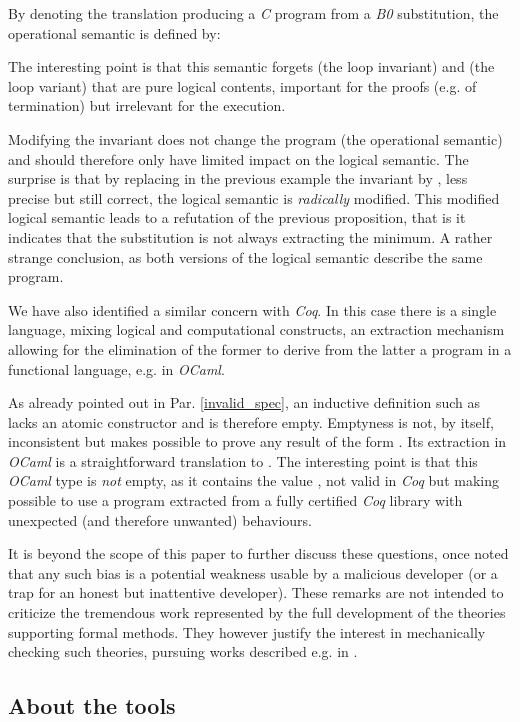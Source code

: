 \documentclass[conference]{IEEEtran}
\begin{document}
By denoting {\small} the translation producing a \emph{C} program from a
\emph{B0} substitution, the operational semantic is defined by:

The interesting point is that this semantic forgets {\small} (the loop invariant) and
{\small} (the loop variant) that are pure logical contents, important for the proofs (e.g.
of termination) but irrelevant for the execution.

Modifying the invariant does not change the program (the operational semantic) and should
therefore only have limited impact on the logical semantic. The surprise is that by replacing
in the previous example the invariant {\small} by
{\small}, less precise but still correct, the logical semantic is
\emph{radically} modified. This modified logical semantic leads to a refutation of the
previous proposition, that is it indicates that the substitution is not always extracting the
minimum. A rather strange conclusion, as both versions of the logical semantic describe the
same program.

We have also identified a similar concern with \emph{Coq}. In this case there is a single
language, mixing logical and computational constructs, an extraction mechanism allowing for
the elimination of the former to derive from the latter a program in a functional language,
e.g. in \emph{OCaml}.

As already pointed out in Par. \ref{invalid_spec}, an inductive definition such as
{\small} lacks an atomic
constructor and is therefore empty. Emptyness is not, by itself, inconsistent but makes
possible to prove any result of the form {\small}. Its extraction in
\emph{OCaml} is a straightforward translation to
{\small}. The interesting point is that this
\emph{OCaml} type is \emph{not} empty, as it contains the value
{\small}, not valid in \emph{Coq} but making
possible to use a program extracted from a fully certified \emph{Coq} library with unexpected
(and therefore unwanted) behaviours.

It is beyond the scope of this paper to further discuss these questions, once noted that any
such bias is a potential weakness usable by a malicious developer (or a trap for an honest
but inattentive developer). These remarks are not intended to criticize the tremendous work
represented by the full development of the theories supporting formal methods. They however
justify the interest in mechanically checking such theories, pursuing works described e.g. in
\cite{cha:1,bod:1b,Barras99}.

\subsection{About the tools}\label{tool_error}
\end{document}
